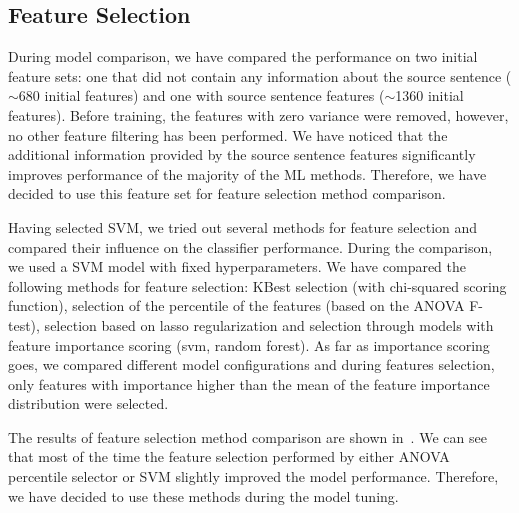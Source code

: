 \subsection{Feature Selection}

During model comparison, we have compared the performance on two initial feature sets:
one that did not contain any information about the source sentence ($\sim$680 initial features)
and one with source sentence features ($\sim$1360 initial features). Before training,
the features with zero variance were removed, however, no other feature filtering has been
performed. We have noticed that the additional information provided by the source sentence features
significantly improves performance of the majority of the ML methods. Therefore, we have decided
to use this feature set for feature selection method comparison.

Having selected SVM, we tried out several methods for feature
selection and compared their influence on the classifier performance. During the comparison,
we used a SVM model with fixed hyperparameters. We have compared the following methods for
feature selection: KBest selection (with chi-squared scoring function), selection of the percentile
of the features (based on the ANOVA F-test),
selection based on lasso regularization and selection through models with feature importance
scoring (svm, random forest). As far as importance scoring goes, we compared different
model configurations and during features selection, only features with importance higher
than the mean of the feature importance distribution were selected.

The results of feature selection method comparison are shown in~. We can see
that most of the time the feature selection performed by either ANOVA percentile selector or
SVM slightly improved the model performance. Therefore, we have decided to use these methods during
the model tuning.

